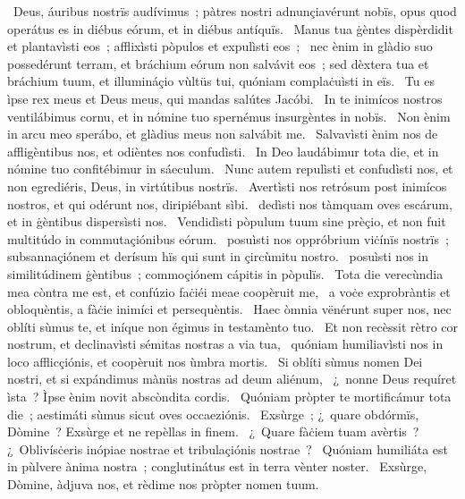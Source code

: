 \psalmChapterWithInscription{}
{ }
{%
~Deus, áuribus nostrïs audívimus~; pàtres nostri adnunçiavérunt nobïs, opus quod operátus es in diébus eórum, et in diébus antíquïs. 
~Manus tua ġèntes dispèrdidit et plantavìsti eos~; afflixìsti pòpulos et expulìsti eos~; 
~nec ènim in glàdio suo possedérunt terram, et bráchium eórum non salvávit eos~; sed dèxtera tua et bráchium tuum, et illumináçio vùltüs tui, quóniam complaċuìsti in eïs. 
~Tu es ìpse rex meus et Deus meus, qui mandas salútes Jacóbi. 
~In te inimícos nostros ventilábimus cornu, et in nómine tuo spernémus insurgèntes in nobïs. 
~Non ènim in arcu meo sperábo, et glàdius meus non salvábit me. 
~Salvavìsti ènim nos de affligèntibus nos, et odièntes nos confudìsti. 
~In Deo laudábimur tota die, et in nómine tuo confitébimur in sáeculum. 
~Nunc autem repulìsti et confudìsti nos, et non egrediéris, Deus, in virtútibus nostrïs. 
~Avertìsti nos retrósum post inimícos nostros, et qui odérunt nos, diripiébant sìbi. 
~dedìsti nos tàmquam oves escárum, et in ġèntibus dispersìsti nos. 
~Vendidìsti pòpulum tuum sine prèçio, et non fuit multitúdo in commutaçiónibus eórum. 
~posuìsti nos oppróbrium viċínïs nostrïs~; subsannaçiónem et derísum hïs qui sunt in çircùmitu nostro. 
~posuìsti nos in similitúdinem ġèntibus~; commoçiónem cápitis in pòpulïs. 
~Tota die verecùndia mea còntra me est, et confúzio faċiéi meae coopèruit me, 
~a voċe exprobràntis et obloquèntis, a fàċie inimíci et persequèntis. 
~Haec òmnia vënérunt super nos, nec oblíti sùmus te, et iníque non égimus in testamènto tuo. 
~Et non recèssit rètro cor nostrum, et declinavìsti sémitas nostras a via tua, 
~quóniam humiliavìsti nos in loco afflicçiónis, et coopèruit nos ùmbra mortis. 
~Si oblíti sùmus nomen Dei nostri, et si expándimus mànüs nostras ad deum aliénum, 
~¿~nonne Deus requíret ìsta~? Ìpse ènim novit abscòndita cordis. 
~Quóniam pròpter te mortificámur tota die~; aestimáti sùmus sicut oves occaeziónis. 
~Exsùrge~; ¿~quare obdórmïs, Dòmine~? Exsùrge et ne repèllas in finem. 
~¿~Quare fàċiem tuam avèrtis~? ¿~Oblivísċeris inópiae nostrae et tribulaçiónis nostrae~? 
~Quóniam humiliáta est in pùlvere ànima nostra~; conglutinátus est in terra vènter noster. 
~Exsùrge, Dòmine, àdjuva nos, et rèdime nos pròpter nomen tuum. 
}
